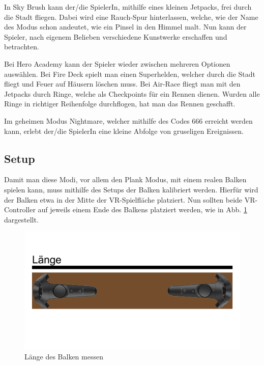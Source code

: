 In Sky Brush kann der/die SpielerIn, mithilfe eines kleinen Jetpacks, frei durch die Stadt fliegen.
Dabei wird eine Rauch-Spur hinterlassen, welche, wie der Name des Modus schon andeutet, wie ein Pinsel in den Himmel malt.
Nun kann der Spieler, nach eigenem Belieben verschiedene Kunstwerke erschaffen und betrachten.
~\cite{ToastGames_2021_Steam}

Bei Hero Academy kann der Spieler wieder zwischen mehreren Optionen auswählen.
Bei Fire Deck spielt man einen Superhelden, welcher durch die Stadt fliegt und Feuer auf Häusern löschen muss.
Bei Air-Race fliegt man mit den Jetpacks durch Ringe, welche als Checkpoints für ein Rennen dienen.
Wurden alle Ringe in richtiger Reihenfolge durchflogen, hat man das Rennen geschafft.
~\cite{ToastGames_2021_Steam}

Im geheimen Modus Nightmare, welcher mithilfe des Codes 666 erreicht werden kann, erlebt der/die SpielerIn eine kleine Abfolge von gruseligen Ereignissen.
~\cite{ToastGames_2021_VivePort}

\subsection{Setup}
\label{sec:richiesplankexperience_setup}

Damit man diese Modi, vor allem den Plank Modus, mit einem realen Balken spielen kann, muss mithilfe des Setups der Balken kalibriert werden.
Hierfür wird der Balken etwa in der Mitte der VR-Spielfläche platziert.
Nun sollten beide VR-Controller auf jeweils einem Ende des Balkens platziert werden, wie in Abb. \ref{fig:beam_length_measurement} dargestellt.

\begin {figure}
    \includegraphics[scale=0.18]{pics/beam_length_measurement}
    \caption{L\"ange des Balken messen}
    \label{fig:beam_length_measurement}
\end {figure}

